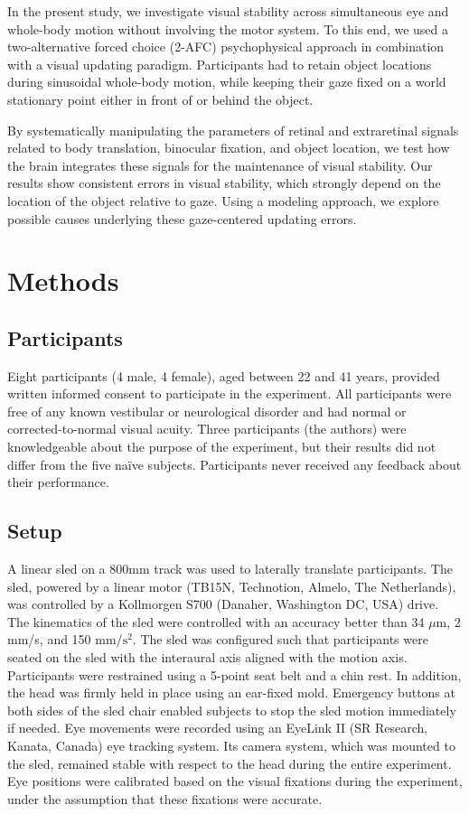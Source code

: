 In the present study, we investigate visual stability across simultaneous eye and whole-body motion without involving the motor system. To this end, we used a two-alternative forced choice (2-AFC) psychophysical approach in combination with a visual updating paradigm. Participants had to retain object locations during sinusoidal whole-body motion, while keeping their gaze fixed on a world stationary point either in front of or behind the object.

By systematically manipulating the parameters of retinal and extraretinal signals related to body translation, binocular fixation, and object location, we test how the brain integrates these signals for the maintenance of visual stability. Our results show consistent errors in visual stability, which strongly depend on the location of the object relative to gaze. Using a modeling approach, we explore possible causes underlying these gaze-centered updating errors.


\section{Methods}
\label{p2:sec:methods}

\subsection{Participants}

Eight participants (4 male, 4 female), aged between 22 and 41 years, provided written informed consent to participate in the experiment. All participants were free of any known vestibular or neurological disorder and had normal or corrected-to-normal visual acuity. Three participants (the authors) were knowledgeable about the purpose of the experiment, but their results did not differ from the five na\"ive subjects. Participants never received any feedback about their performance.

\subsection{Setup}

A linear sled on a 800mm track was used to laterally translate participants. The sled, powered by a linear motor (TB15N, Technotion, Almelo, The Netherlands), was controlled by a Kollmorgen S700 (Danaher, Washington DC, USA) drive. The kinematics of the sled were controlled with an accuracy better than 34 $\mu$m, 2 mm/s, and 150 mm/$\text{s}^2$. The sled was configured such that participants were seated on the sled with the interaural axis aligned with the motion axis. Participants were restrained using a 5-point seat belt and a chin rest. In addition, the head was firmly held in place using an ear-fixed mold.  Emergency buttons at both sides of the sled chair enabled subjects to stop the sled motion immediately if needed. Eye movements were recorded using an EyeLink II (SR Research, Kanata, Canada) eye tracking system. Its camera system, which was mounted to the sled, remained stable with respect to the head during the entire experiment. Eye positions were calibrated based on the visual fixations during the experiment, under the assumption that these fixations were accurate.

